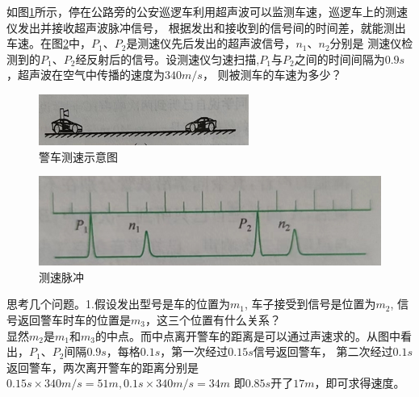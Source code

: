 \documentclass[windows,csize4]{BHCexam}
\begin{document}
\begin{groups}
\begin{questions}[]
        \question[5] 如图\ref{fig:fig_2_7}所示，停在公路旁的公安巡逻车利用超声波可以监测车速，巡逻车上的测速仪发出并接收超声波脉冲信号，
        根据发出和接收到的信号间的时间差，就能测出车速。在图\ref{fig:fig_2_8}中，$P_1$、$P_2$是测速仪先后发出的超声波信号，$n_1$、$n_2$分别是
        测速仪检测到的$P_1$、$P_2$经反射后的信号。设测速仪匀速扫描,$P_1$与$P_2$之间的时间间隔为$0.9s$，超声波在空气中传播的速度为$340m/s$，
        则被测车的车速为多少？
        \begin{figure}[htb]
            \centering
            \includegraphics [scale=0.75,trim=0 0 0 0]{./image/fig_2_7.PNG}
            \caption{警车测速示意图}
            \label{fig:fig_2_7}
        \end{figure}
        \begin{figure}[htb]
            \centering
            \includegraphics [scale=0.75,trim=0 0 0 0]{./image/fig_2_8.PNG}
            \caption{测速脉冲}
            \label{fig:fig_2_8}
        \end{figure}
        \begin{solution}{0.5cm}
            \methodonly 思考几个问题。1.假设发出型号是车的位置为$m_1$, 车子接受到信号是位置为$m_2$, 信号返回警车时车的位置是$m_3$，这三个位置有什么关系？\\
            显然$m_2$是$m_1$和$m_3$的中点。而中点离开警车的距离是可以通过声速求的。从图中看出，$P_1$、$P_2$间隔$0.9s$，每格$0.1s$，第一次经过$0.15s$信号返回警车，
            第二次经过$0.1s$返回警车，两次离开警车的距离分别是$0.15s\times 340m/s=51m,0.1s\times 340m/s=34m$ 即$0.85s$开了$17m$，即可求得速度。
        \end{solution}


\end{questions}
\end{groups}
\end{document}
